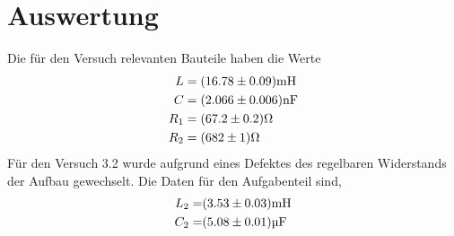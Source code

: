 \section{Auswertung}
\label{sec:Auswertung}
Die für den Versuch relevanten Bauteile haben die Werte
\begin{eqnarray}
  L 	&= (\num{16.78 +- 0.09}) \text{mH}	\\
  C 	&= (\num{2.066 +- 0.006}) \text{nF}	\\
  R_1 	&= (\num{67.2 +- 0.2}) \Omega	\\
  R_2 	&= (\num{682 +- 1}) \Omega
  \label{eqn:Bau}
\end{eqnarray}
Für den Versuch 3.2 wurde aufgrund eines Defektes des regelbaren Widerstands der Aufbau gewechselt. Die Daten für den Aufgabenteil sind,\begin{eqnarray}
  L_2 =& (\num{3.53 +- 0.03}) \text{mH}	\\
  C_2 =& (\num{5.08 +- 0.01}) \text{µF}
\end{eqnarray}
